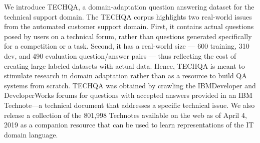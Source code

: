 We introduce TECHQA, a domain-adaptation question answering dataset for the technical support domain. The TECHQA corpus highlights two real-world issues from the automated customer support domain. First, it contains actual questions posed by users on a technical forum, rather than questions generated specifically for a competition or a task. Second, it has a real-world size --- 600 training, 310 dev, and 490 evaluation question/answer pairs --- thus reflecting the cost of creating large labeled datasets with actual data.  Hence, TECHQA is meant to stimulate research in domain adaptation rather than as a resource to build QA systems from scratch.  TECHQA was obtained by crawling the IBMDeveloper and DeveloperWorks forums for questions with accepted answers provided in an IBM Technote—a technical document that addresses a specific technical issue. We also release a collection of the 801,998 Technotes available on the web as of April 4, 2019 as a companion resource that can be used to learn representations of the IT domain language.
